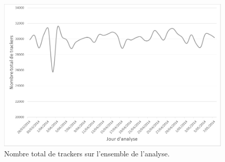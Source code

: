 \begin{figure}[h]
	\centering
	\includegraphics[scale=.56]{Exp_40jours/Exp1_parser_total_trackers_NB.png}
	\caption{\label{Exp1_parser_total_trackers}Nombre total de trackers sur l'ensemble de l'analyse.}
\end{figure}

